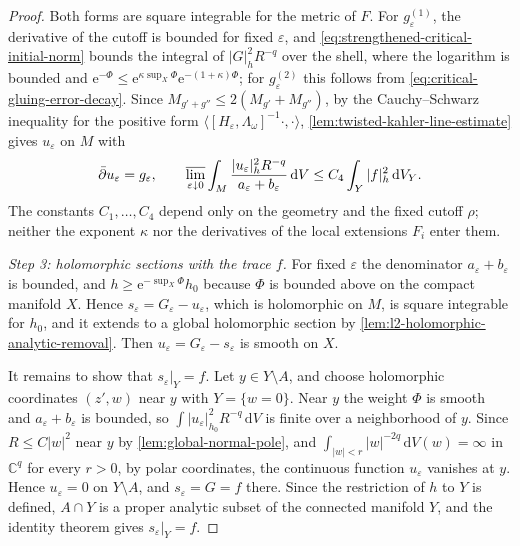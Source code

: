 \begin{proof}
Both forms are square integrable for the metric of $F$. For $g_\varepsilon^{(1)}$, the derivative of the cutoff is bounded for fixed $\varepsilon$, and \eqref{eq:strengthened-critical-initial-norm} bounds the integral of $|G|_h^2R^{-q}$ over the shell, where the logarithm is bounded and $\mathrm e^{-\Phi}\leq\mathrm e^{\kappa\sup_X\Phi}\mathrm e^{-(1+\kappa)\Phi}$; for $g_\varepsilon^{(2)}$ this follows from \eqref{eq:critical-gluing-error-decay}. Since $M_{g'+g''}\leq2(M_{g'}+M_{g''})$, by the Cauchy--Schwarz inequality for the positive form $\langle[H_\varepsilon,\Lambda_\omega]^{-1}\cdot,\cdot\rangle$, \cref{lem:twisted-kahler-line-estimate} gives $u_\varepsilon$ on $M$ with
\begin{equation}\label{eq:global-normal-correction-bound}
 \bar\partial u_\varepsilon=g_\varepsilon,\qquad
 \varlimsup_{\varepsilon\downarrow0}
 \int_M\frac{|u_\varepsilon|_h^2R^{-q}}
                 {a_\varepsilon+b_\varepsilon}\,\mathrm dV
       \leq C_4\int_Y|f|_h^2\,\mathrm dV_Y.
\end{equation}
The constants $C_1,\ldots,C_4$ depend only on the geometry and the fixed cutoff $\rho$; neither the exponent $\kappa$ nor the derivatives of the local extensions $F_i$ enter them.

\emph{Step 3: holomorphic sections with the trace $f$.} For fixed $\varepsilon$ the denominator $a_\varepsilon+b_\varepsilon$ is bounded, and $h\geq\mathrm e^{-\sup_X\Phi}h_0$ because $\Phi$ is bounded above on the compact manifold $X$. Hence $s_\varepsilon=G_\varepsilon-u_\varepsilon$, which is holomorphic on $M$, is square integrable for $h_0$, and it extends to a global holomorphic section by \cref{lem:l2-holomorphic-analytic-removal}. Then $u_\varepsilon=G_\varepsilon-s_\varepsilon$ is smooth on $X$.

It remains to show that $s_\varepsilon|_Y=f$. Let $y\in Y\setminus A$, and choose holomorphic coordinates $(z',w)$ near $y$ with $Y=\{w=0\}$. Near $y$ the weight $\Phi$ is smooth and $a_\varepsilon+b_\varepsilon$ is bounded, so $\int|u_\varepsilon|_{h_0}^2R^{-q}\,\mathrm dV$ is finite over a neighborhood of $y$. Since $R\leq C|w|^2$ near $y$ by \cref{lem:global-normal-pole}, and $\int_{|w|<r}|w|^{-2q}\,\mathrm dV(w)=\infty$ in $\mathbb C^q$ for every $r>0$, by polar coordinates, the continuous function $u_\varepsilon$ vanishes at $y$. Hence $u_\varepsilon=0$ on $Y\setminus A$, and $s_\varepsilon=G=f$ there. Since the restriction of $h$ to $Y$ is defined, $A\cap Y$ is a proper analytic subset of the connected manifold $Y$, and the identity theorem gives $s_\varepsilon|_Y=f$.


\end{proof}
